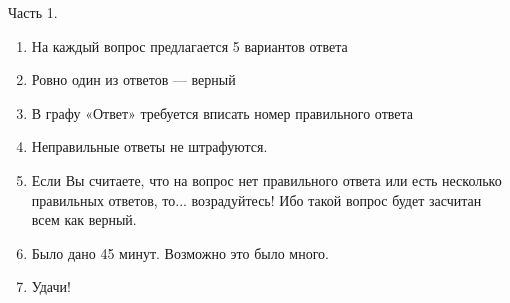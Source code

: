 \documentclass[12pt, a4paper]{article}\usepackage[]{graphicx}\usepackage[]{color}
\begin{document}
Часть 1.
\begin{enumerate}
\item На каждый вопрос предлагается 5 вариантов ответа
\item Ровно один из ответов — верный
\item В графу «Ответ» требуется вписать номер правильного ответа
\item Неправильные ответы не штрафуются.
\item Если Вы считаете, что на вопрос нет правильного ответа или есть несколько правильных ответов, то... возрадуйтесь! Ибо такой вопрос будет засчитан всем как верный.
\item Было дано 45 минут. Возможно это было много.
\item Удачи!
\end{enumerate}
\end{document}
